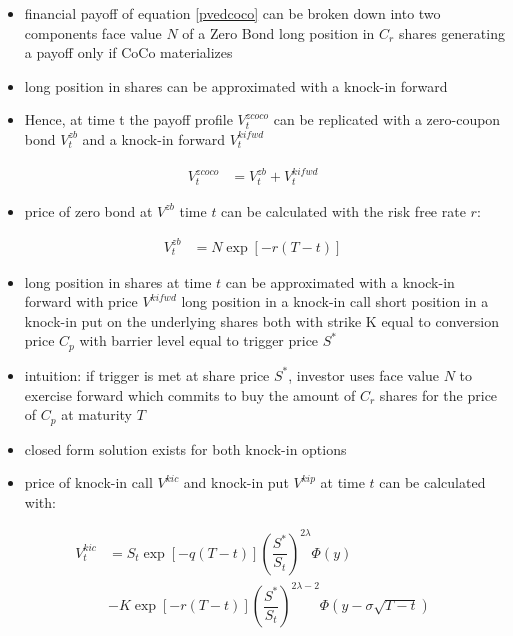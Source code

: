 \begin{itemize}
\item financial payoff of equation \ref{pvedcoco} can be broken down into two components 
\subitem face value $N$ of a Zero Bond
\subitem long position in $C_r$ shares generating a payoff only if CoCo materializes
\item long position in shares can be approximated with a knock-in forward
\item Hence, at time t the payoff profile $V^{zcoco}_t$ can be replicated with a zero-coupon bond $V^{zb}_t$ and a knock-in forward $V_t^{kifwd}$
\end{itemize}
\begin{align}
V^{zcoco}_t &= V^{zb}_t + V_t^{kifwd}
\end{align}

\begin{itemize}
\item price of zero bond at $V^{zb}$ time $t$ can be calculated with the risk free rate $r$:
\end{itemize}
\begin{align}
V^{zb}_t &= N \exp\left[- r (T - t)\right]
\end{align}

\begin{itemize}
\item long position in shares at time $t$ can be approximated with a knock-in forward with price $V^{kifwd}$
	\subitem long position in a knock-in call
	\subitem short position in a knock-in put on the underlying shares
	\subitem both with strike K equal to conversion price $C_p$ 
	\subitem with barrier level equal to trigger price $S^*$
\item intuition: if trigger is met at share price $S^*$, investor uses face value $N$ to exercise forward which commits to buy the amount of $C_r$ shares for the price of $C_p$ at maturity $T$
\end{itemize}

\begin{itemize}
\item closed form solution exists for both knock-in options \citep{merton1973theory}
\item price of knock-in call $V^{kic}$ and knock-in put $V^{kip}$ at time $t$ can be calculated with:
\end{itemize}

\begin{align} \label{pvkic}
V_t^{ kic } &= S_t \exp \left[ - q \left(T-t\right) \right] \left( \dfrac{ S^* }{ S_t } \right) ^ { 2 \lambda } \Phi\left( y \right)\nonumber \\ 
&- K \exp \left[ - r \left(T-t\right) \right] \left( \dfrac{ S^* }{ S_t } \right) ^ { 2 \lambda - 2} \Phi \left( y - \sigma \sqrt{T-t} \right)
\end{align}

